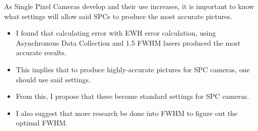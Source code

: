 \documentclass{beamer}
\begin{document}
\begin{frame}
\end{frame}

\begin{frame}
   As Single Pixel Cameras develop and their use increases, it is important to know what settings will allow said SPCs to produce the most accurate pictures.
  \begin{itemize}
  \item I found that calculating error with EWH error calculation, using Asynchronous Data Collection and 1.5 FWHM lasers produced the most accurate results.
  \item This implies that to produce highly-accurate pictures for SPC cameras, one should use said settings.
  \item From this, I propose that these become standard settings for SPC cameras.
  \item I also suggest that more research be done into FWHM to figure out the optimal FWHM.
  \end{itemize}
\end{frame}

\begin{frame}
\end{frame}

\begin{frame}
  \printbibliography
  
\end{frame}
\end{document}
